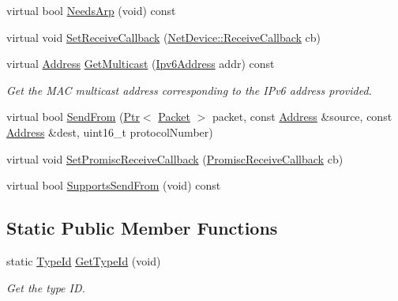 \begin{DoxyCompactItemize}
\item 
virtual bool \hyperlink{classns3_1_1WaveNetDevice_afe298fb0f9f6977b5bb0406f915236fa}{Needs\+Arp} (void) const 
\item 
virtual void \hyperlink{classns3_1_1WaveNetDevice_a98a6505182abba177a0ab348356301d8}{Set\+Receive\+Callback} (\hyperlink{classns3_1_1NetDevice_ad5e5e1ca187472bc2ba99575d8def568}{Net\+Device\+::\+Receive\+Callback} cb)
\item 
virtual \hyperlink{classns3_1_1Address}{Address} \hyperlink{classns3_1_1WaveNetDevice_a26c4774de7786f9ca29d7e07270770f1}{Get\+Multicast} (\hyperlink{classns3_1_1Ipv6Address}{Ipv6\+Address} addr) const 
\begin{DoxyCompactList}\small\item\em Get the M\+AC multicast address corresponding to the I\+Pv6 address provided. \end{DoxyCompactList}\item 
virtual bool \hyperlink{classns3_1_1WaveNetDevice_a3d5db01ed8dc819c146734c756227a3c}{Send\+From} (\hyperlink{classns3_1_1Ptr}{Ptr}$<$ \hyperlink{classns3_1_1Packet}{Packet} $>$ packet, const \hyperlink{classns3_1_1Address}{Address} \&source, const \hyperlink{classns3_1_1Address}{Address} \&dest, uint16\+\_\+t protocol\+Number)
\item 
virtual void \hyperlink{classns3_1_1WaveNetDevice_a7ebc8fb3b0f840c9f1f62b5de8987cf4}{Set\+Promisc\+Receive\+Callback} (\hyperlink{classns3_1_1NetDevice_a427225795919f26c414bee2ea3f31ed2}{Promisc\+Receive\+Callback} cb)
\item 
virtual bool \hyperlink{classns3_1_1WaveNetDevice_afbb333ee66fb43ea4814e55621cf669f}{Supports\+Send\+From} (void) const 
\end{DoxyCompactItemize}
\subsection*{Static Public Member Functions}
\begin{DoxyCompactItemize}
\item 
static \hyperlink{classns3_1_1TypeId}{Type\+Id} \hyperlink{classns3_1_1WaveNetDevice_a89ef5e155729b91ccf8c5e057bdb31af}{Get\+Type\+Id} (void)
\begin{DoxyCompactList}\small\item\em Get the type ID. \end{DoxyCompactList}\end{DoxyCompactItemize}
